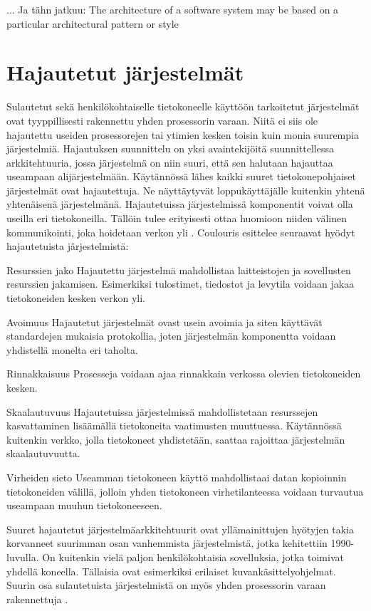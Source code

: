\documentclass[utf8]{gradu3}
\begin{document}
... Ja tähn jatkuu: The architecture of a software system may be based on a particular architectural pattern or style

\section{Hajautetut järjestelmät}
Sulautetut sekä henkilökohtaiselle tietokoneelle käyttöön tarkoitetut järjestelmät ovat tyyppillisesti rakennettu yhden prosessorin varaan. Niitä ei siis ole hajautettu useiden prosessorejen tai ytimien kesken toisin kuin monia suurempia järjestelmiä. Hajautuksen suunnittelu on yksi avaintekijöitä suunnittellessa arkkitehtuuria, jossa järjestelmä on niin suuri, että sen halutaan hajauttaa useampaan alijärjestelmään. Käytännössä lähes kaikki suuret tietokonepohjaiset järjestelmät ovat hajautettuja. Ne näyttäytyvät loppukäyttäjälle kuitenkin yhtenä yhtenäisenä järjestelmänä. Hajautetuissa järjestelmissä komponentit voivat olla useilla eri tietokoneilla. Tällöin tulee erityisesti ottaa huomioon niiden välinen kommunikointi, joka hoidetaan verkon yli \parencite[s. 480]{Sommerville}. Coulouris \parencite{Coulouris} esittelee seuraavat hyödyt hajautetuista järjestelmistä:


\begin{desclist}
\item[Resurssien jako] Hajautettu järjestelmä mahdollistaa laitteistojen ja sovellusten resurssien jakamisen. Esimerkiksi tulostimet, tiedostot ja levytila voidaan jakaa tietokoneiden kesken verkon yli.
\item[Avoimuus] Hajautetut järjestelmät ovast usein avoimia ja siten käyttävät standardejen mukaisia protokollia, joten järjestelmän komponentta voidaan yhdistellä monelta eri taholta.  
\item[Rinnakkaisuus] Prosesseja voidaan ajaa rinnakkain verkossa olevien tietokoneiden kesken.
\item[Skaalautuvuus] Hajautetuissa järjestelmissä mahdollistetaan resurssejen kasvattaminen lisäämällä tietokoneita vaatimusten muuttuessa. Käytännössä kuitenkin verkko, jolla tietokoneet yhdistetään, saattaa rajoittaa järjestelmän skaalautuvuutta.
\item[Virheiden sieto] Useamman tietokoneen käyttö mahdollistaai datan kopioinnin tietokoneiden välillä, jolloin yhden tietokoneen virhetilanteessa voidaan turvautua useampaan muuhun tietokoneeseen. 
\end{desclist}

Suuret hajautetut järjestelmäarkkitehtuurit ovat yllämainittujen hyötyjen takia korvanneet suurimman osan vanhemmista järjestelmistä, jotka kehitettiin 1990-luvulla. On kuitenkin vielä paljon henkilökohtaisia sovelluksia, jotka toimivat yhdellä koneella. Tällaisia ovat esimerkiksi erilaiset kuvankäsittelyohjelmat. Suurin osa sulautetuista järjestelmistä on myös yhden prosessorin varaan rakennettuja \parencite[s. 480]{Sommerville}. 
\end{document}
